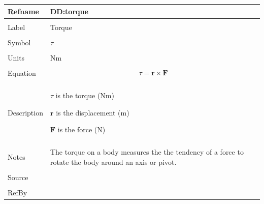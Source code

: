 \documentclass[12pt]{article}
\begin{document}
\noindent \begin{minipage}{\textwidth}
\begin{tabular}{p{} p{}}
\toprule \textbf{Refname} & \textbf{DD:torque}
\label{DD:torque}
\\ \midrule \\
Label & Torque
        \\ \midrule \\
        Symbol & $τ$
                 \\ \midrule \\
                 Units & Nm
                         \\ \midrule \\
                         Equation & \begin{displaymath}
                                    τ=\mathbf{r}\times\mathbf{F}
                                    \end{displaymath}
                                    \\ \midrule \\
                                    Description & \begin{symbDescription}
                                                  \item{$τ$ is the torque (Nm)}
                                                  \item{$\mathbf{r}$ is the displacement (m)}
                                                  \item{$\mathbf{F}$ is the force (N)}
                                                  \end{symbDescription}
                                                  \\ \midrule \\
                                                  Notes & The torque on a body measures the the tendency of a force to rotate the body around an axis or pivot.
                                                          \\ \midrule \\
                                                          Source & \\ \midrule \\
                                                                   RefBy & 
\\ \bottomrule \end{tabular}
\end{minipage}
\par~
\end{document}
